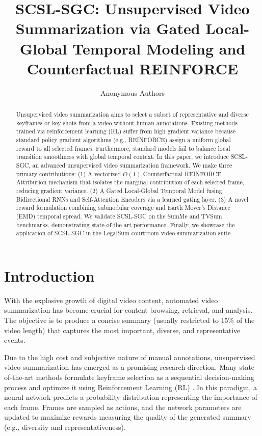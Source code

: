 \documentclass[letterpaper]{article} %
\title{SCSL-SGC: Unsupervised Video Summarization via Gated Local-Global Temporal Modeling and Counterfactual REINFORCE}
\author {
    Anonymous Authors
}
\affil {
    Paper Submission ID: XXX
}
\begin{document}
\maketitle

\begin{abstract}
Unsupervised video summarization aims to select a subset of representative and diverse keyframes or key-shots from a video without human annotations. Existing methods trained via reinforcement learning (RL) suffer from high gradient variance because standard policy gradient algorithms (e.g., REINFORCE) assign a uniform global reward to all selected frames. Furthermore, standard models fail to balance local transition smoothness with global temporal context. In this paper, we introduce SCSL-SGC, an advanced unsupervised video summarization framework. We make three primary contributions: (1) A vectorized $O(1)$ Counterfactual REINFORCE Attribution mechanism that isolates the marginal contribution of each selected frame, reducing gradient variance. (2) A Gated Local-Global Temporal Model fusing Bidirectional RNNs and Self-Attention Encoders via a learned gating layer. (3) A novel reward formulation combining submodular coverage and Earth Mover's Distance (EMD) temporal spread. We validate SCSL-SGC on the SumMe and TVSum benchmarks, demonstrating state-of-the-art performance. Finally, we showcase the application of SCSL-SGC in the LegalSum courtroom video summarization suite.
\end{abstract}

\section{Introduction}
With the explosive growth of digital video content, automated video summarization has become crucial for content browsing, retrieval, and analysis. The objective is to produce a concise summary (usually restricted to 15\% of the video length) that captures the most important, diverse, and representative events.

Due to the high cost and subjective nature of manual annotations, unsupervised video summarization has emerged as a promising research direction. Many state-of-the-art methods formulate keyframe selection as a sequential decision-making process and optimize it using Reinforcement Learning (RL) \cite{zhou2018deep}. In this paradigm, a neural network predicts a probability distribution representing the importance of each frame. Frames are sampled as actions, and the network parameters are updated to maximize rewards measuring the quality of the generated summary (e.g., diversity and representativeness).
\end{document}
